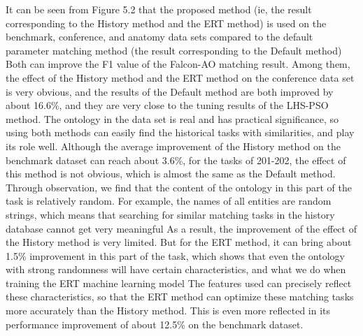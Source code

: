 \documentclass[twoside]{article}
\begin{document}
It can be seen from Figure 5.2 that the proposed method (ie, the result corresponding to the History method and the ERT method) is used on the benchmark, conference, and anatomy data sets compared to the default parameter matching method (the result corresponding to the Default method) Both can improve the F1 value of the Falcon-AO matching result.
Among them, the effect of the History method and the ERT method on the conference data set is very obvious, and the results of the Default method are both improved by about 16.6\%, and they are very close to the tuning results of the LHS-PSO method. The ontology in the data set is real and has practical significance, so using both methods can easily find the historical tasks with similarities, and play its role well.
Although the average improvement of the History method on the benchmark dataset can reach about 3.6\%, for the tasks of 201-202, the effect of this method is not obvious, which is almost the same as the Default method.
Through observation, we find that the content of the ontology in this part of the task is relatively random. For example, the names of all entities are random strings, which means that searching for similar matching tasks in the history database cannot get very meaningful As a result, the improvement of the effect of the History method is very limited.
But for the ERT method, it can bring about 1.5\% improvement in this part of the task, which shows that even the ontology with strong randomness will have certain characteristics, and what we do when training the ERT machine learning model The features used can precisely reflect these characteristics, so that the ERT method can optimize these matching tasks more accurately than the History method.
This is even more reflected in its performance improvement of about 12.5\% on the benchmark dataset.
\end{document}
